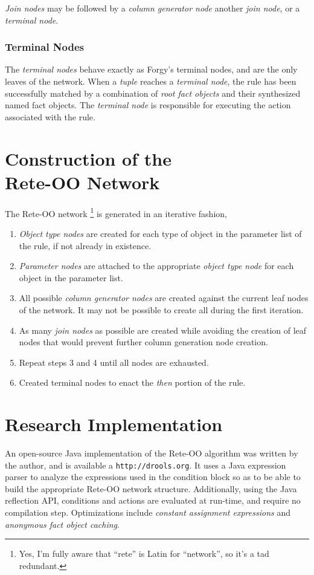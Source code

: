 \documentclass[10pt,twocolumn,letterpaper,colorhighlight]{article}
\begin{document}
\emph{Join nodes} may be followed by a \emph{column generator
node} another \emph{join node}, or a \emph{terminal node}.

\subsubsection{Terminal Nodes}

The \emph{terminal nodes} behave exactly as Forgy's terminal nodes,
and are the only leaves of the network. When a \emph{tuple} reaches
a \emph{terminal node}, the rule has been successfully matched by
a combination of \emph{root fact objects} and their synthesized
named fact objects.  The \emph{terminal node} is responsible for
executing the action associated with the rule.


\section{Construction of the\\Rete-OO Network} 

The Rete-OO network%
	\footnote{Yes, I'm fully aware that ``rete'' is 
		Latin for ``network'', so it's a tad redundant.} 
is generated in an iterative fashion, 

\begin{enumerate}
	\item \emph{Object type nodes} are created for each type of
object in the parameter list of the rule, if not already in
existence.
	\item \emph{Parameter nodes} are attached to the appropriate {\it
object type node} for each object in the parameter list.
	\item All possible \emph{column generator nodes} are created
against the current leaf nodes of the network.  It may not be possible
to create all during the first iteration.
	\item As many \emph{join nodes} as possible are created while
avoiding the creation of leaf nodes that would prevent further column
generation node creation.
	\item Repeat steps 3 and 4 until all nodes are exhausted.
	\item Created terminal nodes to enact the {\it then} portion of
the rule.
\end{enumerate}

\section{Research Implementation}

An open-source Java implementation of the Rete-OO algorithm  was written by
the author, and is available a \verb|http://drools.org|.  It uses a
Java expression parser to analyze the expressions used in the
condition block so as to be able to build the appropriate Rete-OO
network structure. Additionally, using the Java reflection API,
conditions and actions are evaluated at run-time, and require no
compilation step.  Optimizations include \emph{constant assignment
expressions} and \emph{anonymous fact object caching}.




\end{document}
